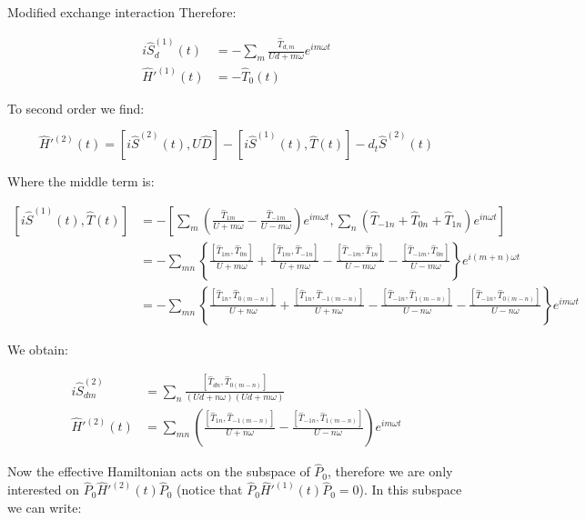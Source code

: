 \begin{section}{Modified exchange interaction}
Therefore:

\begin{align*}
i\hat{S}^{(1)}_d(t) &= -\sum_m \frac{\hat{T}_{d,m}}{Ud+m\omega}e^{im\omega t} \\
\hat{H}'^{(1)}(t) &= -\hat{T}_0(t)
\end{align*}

To second order we find:

\begin{equation}
\hat{H}'^{(2)}(t) = \left[i\hat{S}^{(2)}(t), U \hat{D} \right] - \left[ i\hat{S}^{(1)}(t), \hat{T}(t) \right] - d_t\hat{S}^{(2)}(t)
\end{equation}

Where the middle term is:

\begin{align*}
\left[ i\hat{S}^{(1)}(t), \hat{T}(t) \right] &= -\left[\sum_m \left( \frac{\hat{T}_{1m}}{U+m\omega} - \frac{\hat{T}_{-1m}}{U-m\omega} \right)e^{im \omega t}, \sum_n \left( \hat{T}_{-1n} +\hat{T}_{0n} + \hat{T}_{1n} \right) e^{in\omega t} \right] \\
&= -\sum_{mn} \left\{ \frac{\left[\hat{T}_{1m}, \hat{T}_{0n} \right]}{U+m\omega} + \frac{\left[\hat{T}_{1m}, \hat{T}_{-1n} \right]}{U+m\omega} - \frac{\left[\hat{T}_{-1m}, \hat{T}_{1n} \right]}{U-m\omega} - \frac{\left[\hat{T}_{-1m}, \hat{T}_{0n} \right]}{U-m\omega} \right\} e^{i(m+n)\omega t} \\
&= -\sum_{mn} \left\{ \frac{\left[\hat{T}_{1n}, \hat{T}_{0(m-n)} \right]}{U+n\omega} + \frac{\left[\hat{T}_{1n}, \hat{T}_{-1(m-n)} \right]}{U+n\omega} - \frac{\left[\hat{T}_{-1n}, \hat{T}_{1(m-n)} \right]}{U-n\omega} - \frac{\left[\hat{T}_{-1n}, \hat{T}_{0(m-n)} \right]}{U-n\omega} \right\} e^{im\omega t}
\end{align*}

We obtain:

\begin{align*}
i\hat{S}^{(2)}_{dm} &= \sum_n \frac{\left[ \hat{T}_{dn}, \hat{T}_{0(m-n)} \right]}{(Ud+n\omega)(Ud+m\omega)} \\
\hat{H}'^{(2)}(t) &= \sum_{mn} \left( \frac{\left[\hat{T}_{1n}, \hat{T}_{-1(m-n)} \right]}{U+n\omega} - \frac{\left[\hat{T}_{-1n}, \hat{T}_{1(m-n)} \right]}{U-n\omega} \right) e^{im\omega t}
\end{align*}

Now the effective Hamiltonian acts on the subspace of $\hat{P}_0$, therefore we are only interested on $\hat{P}_0 \hat{H}'^{(2)}(t) \hat{P}_0$ (notice that $\hat{P}_0 \hat{H}'^{(1)}(t) \hat{P}_0 = 0$). In this subspace we can write:


\end{section}
